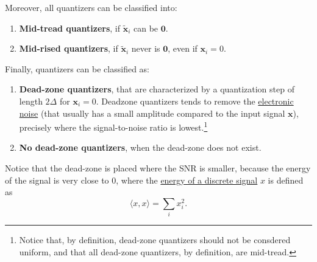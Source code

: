 Moreover, all quantizers can be classified into:
\begin{enumerate}
\item \textbf{Mid-tread quantizers}, if $\tilde{{\mathbf x}}_i$ can be ${\mathbf 0}$.
\item \textbf{Mid-rised quantizers}, if $\tilde{{\mathbf x}}_i$ never is ${\mathbf 0}$,
  even if ${\mathbf x}_i=0$.
\end{enumerate}

Finally, quantizers can be classified as:
\begin{enumerate}
\item \textbf{Dead-zone quantizers}, that are characterized by a
  quantization step of length $2\Delta$ for ${\mathbf
    x}_i=0$. Deadzone quantizers tends to remove the
  \href{https://en.wikipedia.org/wiki/Noise_(electronics)}{electronic
    noise} (that usually has a small amplitude compared to the input
  signal ${\mathbf x}$), precisely where the signal-to-noise ratio is
  lowest.\footnote{Notice that, by definition, dead-zone quantizers
    should not be consdered uniform, and that all dead-zone
    quantizers, by definition, are mid-tread.}
\item \textbf{No dead-zone quantizers}, when the dead-zone does not
  exist.
\end{enumerate}

Notice that the dead-zone is placed where the SNR is smaller, because
the energy of the signal is very close to 0, where the
\href{https://en.wikipedia.org/wiki/Energy_(signal_processing)}{energy
  of a discrete signal} $x$ is defined as
\begin{equation}
  \langle x, x\rangle =  \sum_{i}{x_i^2}.
\end{equation}

